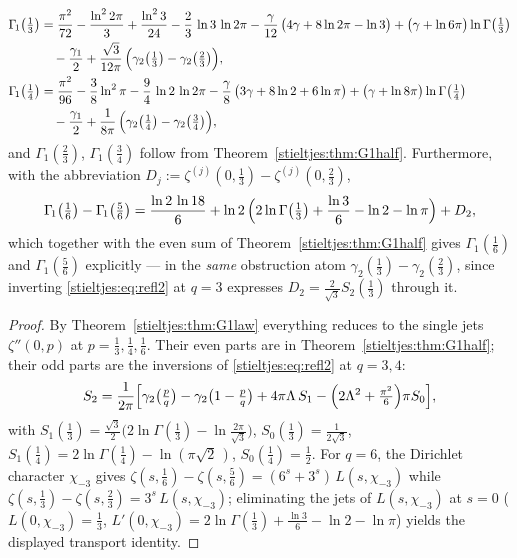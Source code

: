 \begin{theorem}\label{stieltjes:thm:G1thirds}
\begin{align*}
\Gamma_{\!1}\bigl(\tfrac13\bigr)
&=\frac{\pi^{2}}{72}-\frac{\ln ^{2}2\pi}{3}+\frac{\ln ^{2}3}{24}
-\frac{2}{3}\,\ln 3\,\ln 2 \pi
-\frac{\gamma}{12}\,\bigl(4 \gamma+8 \ln 2 \pi-\ln 3\bigr)
+\bigl(\gamma+\ln 6 \pi\bigr) \ln \Gamma\bigl(\tfrac{1}{3}\bigr)\\
&\quad-\frac{\gamma_{1}}{2}
+\frac{\sqrt{3}}{12 \pi}\,\Bigl(\gamma_{2}\bigl(\tfrac{1}{3}\bigr)-\gamma_{2}\bigl(\tfrac{2}{3}\bigr)\Bigr),\\
\Gamma_{\!1}\bigl(\tfrac14\bigr)
&=\frac{\pi^{2}}{96}-\frac{3}{8} \ln ^{2}\pi-\frac{9}{4}\,\ln 2\,\ln 2 \pi
-\frac{\gamma}{8}\,\bigl(3 \gamma+8 \ln 2+6 \ln \pi\bigr)
+\bigl(\gamma+\ln 8 \pi\bigr) \ln \Gamma\bigl(\tfrac{1}{4}\bigr)\\
&\quad-\frac{\gamma_{1}}{2}
+\frac{1}{8 \pi}\,\Bigl(\gamma_{2}\bigl(\tfrac{1}{4}\bigr)-\gamma_{2}\bigl(\tfrac{3}{4}\bigr)\Bigr),
\end{align*}
and $\Gamma_{\!1}(\tfrac23)$, $\Gamma_{\!1}(\tfrac34)$ follow from
Theorem~\ref{stieltjes:thm:G1half}. Furthermore, with the abbreviation
$D_j:=\zeta^{(j)}(0,\tfrac13)-\zeta^{(j)}(0,\tfrac23)$,
\[
\Gamma_{\!1}\bigl(\tfrac16\bigr)-\Gamma_{\!1}\bigl(\tfrac56\bigr)
=\frac{\ln2\,\ln18}{6}
+\ln2\,\Bigl(2\ln\Gamma\bigl(\tfrac13\bigr)+\frac{\ln3}{6}-\ln2-\ln\pi\Bigr)
+D_2 ,
\]
which together with the even sum of Theorem~\ref{stieltjes:thm:G1half} gives
$\Gamma_{\!1}(\tfrac16)$ and $\Gamma_{\!1}(\tfrac56)$ explicitly — in the
\emph{same} obstruction atom $\gamma_2(\tfrac13)-\gamma_2(\tfrac23)$, since
inverting \eqref{stieltjes:eq:refl2} at $q=3$ expresses
$D_2=\tfrac{2}{\sqrt3}S_2(\tfrac13)$ through it.
\end{theorem}

\begin{proof}
By Theorem~\ref{stieltjes:thm:G1law} everything reduces to the single jets
$\zeta''(0,p)$ at $p=\tfrac13,\tfrac14,\tfrac16$. Their even parts are in
Theorem~\ref{stieltjes:thm:G1half}; their odd parts are the inversions of
\eqref{stieltjes:eq:refl2} at $q=3,4$:
\[
S_2=\frac{1}{2\pi}\Bigl[\gamma_2\bigl(\tfrac pq\bigr)-\gamma_2\bigl(1-\tfrac pq\bigr)
+4\pi \Lambda\,S_1-\Bigl(2\Lambda^2+\tfrac{\pi^2}{6}\Bigr)\pi S_0\Bigr],
\]
with $S_1(\tfrac13)=\tfrac{\sqrt3}{2}\bigl(2\ln\Gamma(\tfrac13)-\ln\tfrac{2\pi}{\sqrt3}\bigr)$,
$S_0(\tfrac13)=\tfrac{1}{2\sqrt3}$,
$S_1(\tfrac14)=2\ln\Gamma(\tfrac14)-\ln(\pi\sqrt2\,)$,
$S_0(\tfrac14)=\tfrac12$.
For $q=6$, the Dirichlet character $\chi_{-3}$ gives
$\zeta(s,\tfrac16)-\zeta(s,\tfrac56)=(6^s+3^s)\,L(s,\chi_{-3})$ while
$\zeta(s,\tfrac13)-\zeta(s,\tfrac23)=3^s\,L(s,\chi_{-3})$; eliminating the
jets of $L(s,\chi_{-3})$ at $s=0$
($L(0,\chi_{-3})=\tfrac13$,
$L'(0,\chi_{-3})=2\ln\Gamma(\tfrac13)+\tfrac{\ln3}{6}-\ln2-\ln\pi$)
yields the displayed transport identity.
\end{proof}

